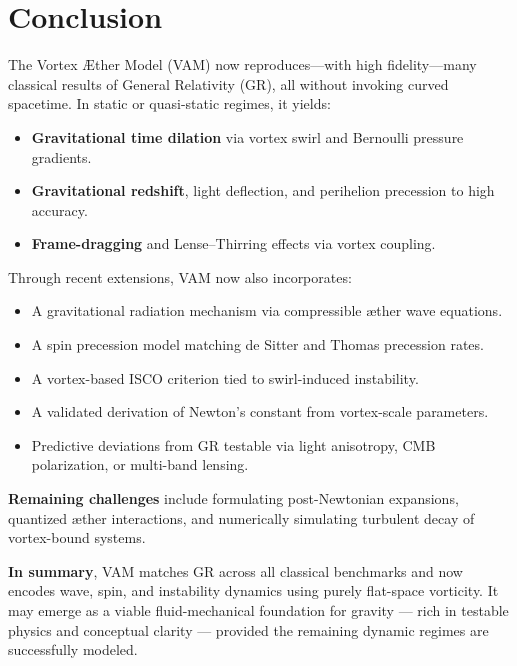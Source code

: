\noindent
\section*{Conclusion}

The Vortex Æther Model (VAM) now reproduces—with high fidelity—many classical results of General Relativity (GR), all without invoking curved spacetime. In static or quasi-static regimes, it yields:

\begin{itemize}
    \item \textbf{Gravitational time dilation} via vortex swirl and Bernoulli pressure gradients.
    \item \textbf{Gravitational redshift}, light deflection, and perihelion precession to high accuracy.
    \item \textbf{Frame-dragging} and Lense–Thirring effects via vortex coupling.
\end{itemize}

Through recent extensions, VAM now also incorporates:
\begin{itemize}
    \item A gravitational radiation mechanism via compressible æther wave equations.
    \item A spin precession model matching de Sitter and Thomas precession rates.
    \item A vortex-based ISCO criterion tied to swirl-induced instability.
    \item A validated derivation of Newton's constant from vortex-scale parameters.
    \item Predictive deviations from GR testable via light anisotropy, CMB polarization, or multi-band lensing.
\end{itemize}

\textbf{Remaining challenges} include formulating post-Newtonian expansions, quantized æther interactions, and numerically simulating turbulent decay of vortex-bound systems.

\textbf{In summary}, VAM matches GR across all classical benchmarks and now encodes wave, spin, and instability dynamics using purely flat-space vorticity. It may emerge as a viable fluid-mechanical foundation for gravity — rich in testable physics and conceptual clarity — provided the remaining dynamic regimes are successfully modeled.
